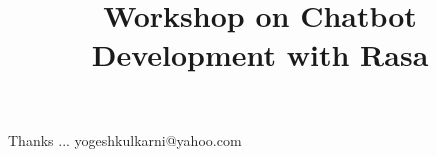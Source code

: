 \documentclass[xcolor=dvipsnames,compress,t,pdf,9pt]{beamer}
\title[\insertframenumber /\inserttotalframenumber]{Workshop on Chatbot Development with Rasa}
\date[\today]{}
\begin{document}
	\begin{frame}
	\titlepage
%
	\end{frame}
	
%	
	
	
	\begin{frame}[c]{}
	Thanks ...
	\vspace{5mm}
	yogeshkulkarni@yahoo.com
	\end{frame}
\end{document}
